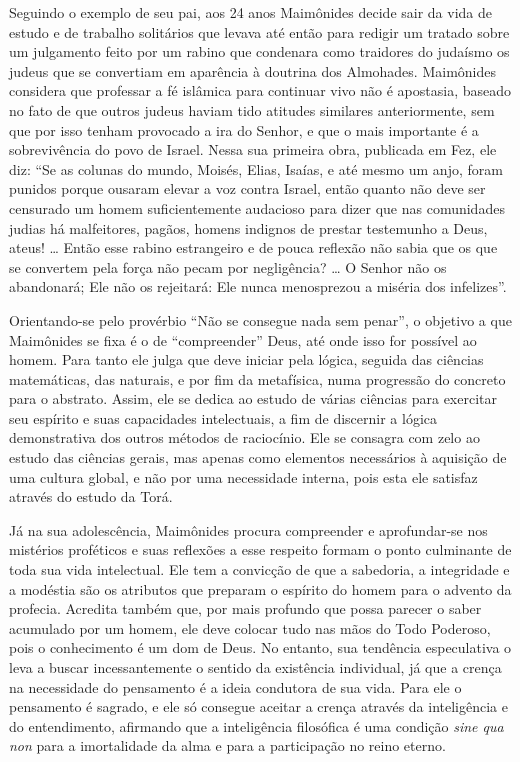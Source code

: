 Seguindo o exemplo de seu pai, aos 24 anos Maimônides decide sair da
vida de estudo e de trabalho solitários que levava até então para
redigir um tratado sobre um julgamento feito por um rabino que condenara
como traidores do judaísmo os judeus que se convertiam em aparência à
doutrina dos Almohades. Maimônides considera que professar a fé
islâmica para continuar vivo não é apostasia, baseado no fato de que outros judeus haviam tido
atitudes similares anteriormente, sem que por isso tenham provocado a
ira do Senhor, e que o mais importante é a sobrevivência do povo de
Israel. Nessa sua primeira obra, publicada em Fez, ele diz: ``Se as
colunas do mundo, Moisés, Elias, Isaías, e até mesmo um anjo, foram
punidos porque ousaram elevar a voz contra Israel, então quanto não
deve ser censurado um homem suficientemente audacioso para dizer que
nas comunidades judias há malfeitores, pagãos, homens indignos de
prestar testemunho a Deus, ateus! \ldots{} Então esse rabino estrangeiro e de
pouca reflexão não sabia que os que se convertem pela força não pecam
por negligência? \ldots{} O Senhor não os abandonará; Ele não os rejeitará:
Ele nunca menosprezou a miséria dos infelizes''.

Orientando-se pelo provérbio ``Não se consegue nada sem penar'', o
objetivo a que Maimônides se fixa é o de ``compreender'' Deus, até onde
isso for possível ao homem. Para tanto ele julga que deve iniciar pela
lógica, seguida das ciências matemáticas, das naturais, e por fim da
metafísica, numa progressão do concreto para o abstrato. Assim, ele se
dedica ao estudo de várias ciências para exercitar seu espírito e suas
capacidades intelectuais, a fim de discernir a lógica demonstrativa dos
outros métodos de raciocínio. Ele se consagra com zelo ao estudo das
ciências gerais, mas apenas como elementos necessários à aquisição de
uma cultura global, e não por uma necessidade interna, pois esta ele
satisfaz através do estudo da Torá.

Já na sua adolescência, Maimônides procura compreender e aprofundar-se
nos mistérios proféticos e suas reflexões a esse respeito formam o ponto
culminante de toda sua vida intelectual. Ele tem a convicção de que a
sabedoria, a integridade e a modéstia são os atributos que preparam o
espírito do homem para o advento da profecia. Acredita também que, por
mais profundo que possa parecer o saber acumulado por um homem, ele deve
colocar tudo nas mãos do Todo Poderoso, pois o conhecimento é um dom de
Deus. No entanto, sua tendência especulativa o leva a buscar
incessantemente o sentido da existência individual, já que a crença na
necessidade do pensamento é a ideia condutora de sua vida. Para ele o
pensamento é sagrado, e ele só consegue aceitar a crença através da
inteligência e do entendimento, afirmando que a inteligência filosófica
é uma condição \emph{sine qua non} para a imortalidade da alma e para a
participação no reino eterno.

